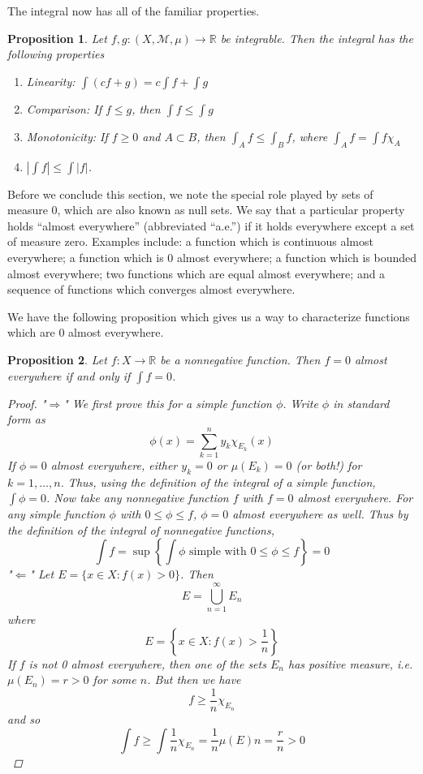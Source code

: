 \documentclass[12pt]{amsart}         %
\newtheorem{proposition}{Proposition}[section]
\theoremstyle{remark}
\newcommand{\R}{\mathbb{R}}
\begin{document}
The integral now has all of the familiar properties.

\begin{proposition}
Let $f, g:(X, \mathcal{M}, \mu) \rightarrow \R$ be integrable. Then the integral has the following properties
\begin{enumerate}
\item Linearity: $\int(c f + g) = c \int f + \int g$
\item Comparison: If $f\leq g$, then $\int f \leq \int g$
\item Monotonicity: If $f\geq 0$ and $A\subset B$, then $\int_A f \leq\int_B f$, where $\int_A f = \int f \chi_A$
\item $|\int f| \leq \int |f| $.
\end{enumerate}
\end{proposition}

Before we conclude this section, we note the special role played by sets of measure 0, which are also known as null sets. We say that a particular property holds ``almost everywhere'' (abbreviated ``a.e.'') if it holds everywhere except a set of measure zero. Examples include: a function which is continuous almost everywhere; a function which is 0 almost everywhere; a function which is bounded almost everywhere; two functions which are equal almost everywhere; and a sequence of functions which converges almost everywhere.

We have the following proposition which gives us a way to characterize functions which are 0 almost everywhere.

\begin{proposition}
Let $f: X \rightarrow \R$ be a nonnegative function. Then $f = 0$ almost everywhere if and only if $\int f = 0$.
\begin{proof}
"$\Rightarrow$" We first prove this for a simple function $\phi$. Write $\phi$ in standard form as 
\[
\phi(x) = \sum_{k = 1}^n
y_k \chi_{E_k}(x)
\]
If $\phi = 0$ almost everywhere, either $y_k = 0$ or $\mu(E_k) = 0$ (or both!) for $k = 1, \dots, n$. Thus, using the definition of the integral of a simple function, $\int \phi = 0$. Now take any nonnegative function $f$ with $f = 0$ almost everywhere. For any simple function $\phi$ with $0 \leq \phi \leq f$, $\phi = 0$ almost everywhere as well. Thus by the definition of the integral of nonnegative functions,
\[
\int f = \sup\left\{ \int \phi \text{ simple with }0 \leq \phi \leq f \right\} = 0
\]
"$\Leftarrow$" Let $E = \{ x \in X : f(x) > 0 \}$. Then 
\[
E = \bigcup_{n=1}^\infty E_n
\]
where
\[
E = \left\{ x \in X : f(x) > \frac{1}{n} \right\}
\]
If $f$ is not 0 almost everywhere, then one of the sets $E_n$ has positive measure, i.e. $\mu(E_n) = r > 0$ for some $n$. But then we have
\[
f \geq \frac{1}{n}\chi_{E_n}
\]
and so
\[
\int f \geq \int \frac{1}{n}\chi_{E_n} = \frac{1}{n} \mu(E)n = \frac{r}{n} > 0
\]
\end{proof}
\end{proposition}
\end{document}
